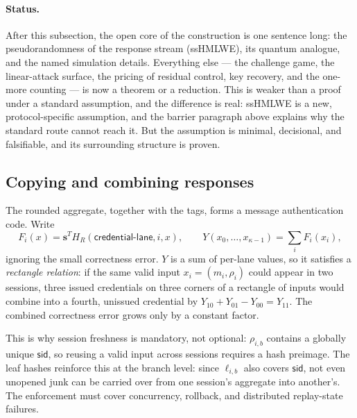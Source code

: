 \documentclass[11pt]{article}
\begin{document}
\paragraph{Status.}
After this subsection, the open core of the construction is one sentence
long: the pseudorandomness of the response stream (ssHMLWE), its quantum
analogue, and the named simulation details.  Everything else --- the
challenge game, the linear-attack surface, the pricing of residual control,
key recovery, and the one-more counting --- is now a theorem or a reduction.
This is weaker than a proof under a standard assumption, and the difference
is real: ssHMLWE is a new, protocol-specific assumption, and the barrier
paragraph above explains why the standard route cannot reach it.  But the
assumption is minimal, decisional, and falsifiable, and its surrounding
structure is proven.

\subsection{Copying and combining responses}
\label{sec:splicing}

The rounded aggregate, together with the tags, forms a message authentication
code.  Write
\[
 F_i(x)=\mathbf s^{T}H_R(\mathsf{credential\mbox{-}lane},i,x),
 \qquad
 Y(x_0,\ldots,x_{\kappa-1})=\sum_i F_i(x_i),
\]
ignoring the small correctness error.  $Y$ is a sum of per-lane values, so it
satisfies a \emph{rectangle relation}: if the same valid input
$x_i=(m_i,\rho_i)$ could appear in two sessions, three issued credentials on
three corners of a rectangle of inputs would combine into a fourth, unissued
credential by $Y_{10}+Y_{01}-Y_{00}=Y_{11}$.  The combined correctness error
grows only by a constant factor.

This is why session freshness is mandatory, not optional: $\rho_{i,b}$
contains a globally unique $\mathsf{sid}$, so reusing a valid input across
sessions requires a hash preimage.  The leaf hashes reinforce this at the
branch level: since $\ell_{i,b}$ also covers $\mathsf{sid}$, not even
unopened junk can be carried over from one session's aggregate into
another's.  The enforcement must cover concurrency,
rollback, and distributed replay-state failures.
\end{document}

